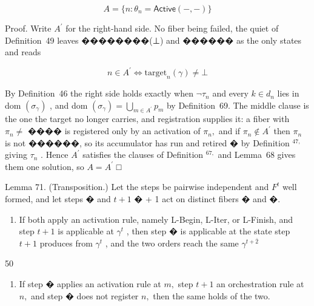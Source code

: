 \documentclass[
  10
]{article}
\providecommand{\tightlist}{%
  \setlength{\itemsep}{0pt}\setlength{\parskip}{0pt}}
\begin{document}
\[
A = \{ n : \theta _ { n } = \mathsf { A c t i v e } ( - , - ) \}\tag{64}
\]

Proof. Write \(A ^ { \prime }\) for the right-hand side. No fiber being
failed, the quiet of Definition~49 leaves ��������(⊥) and ������ as the
only states and reads

\[
n \in A ^ { \prime } \Longleftrightarrow \mathrm { t a r g e t } _ { n } ( \gamma ) \neq \bot
\]

By Definition~46 the right side holds exactly when \(\neg \tau _ { n }\)
and every \(k \in d _ { n }\) lies in dom
\(\left( \sigma _ { \gamma } \right)\) , and dom
\(\textstyle ( \sigma _ { \gamma } ) = \bigcup _ { m \in A ^ { \prime } } p _ { m }\)
by Definition~69. The middle clause is the one the target no longer
carries, and registration supplies it: a fiber with \(\pi _ { n } \neq\)
���� is registered only by an activation of \(\pi _ { n } ,\) and if
\(\pi _ { n } \notin A ^ { \prime }\) then \(\pi _ { n }\) is not
������, so its accumulator has run and retired � by Definition
\(^ { 4 7 , }\) giving \(\tau _ { n }\) . Hence \(A ^ { \prime }\)
satisfies the clauses of Definition \(^ { 6 7 , }\) and Lemma~68 gives
them one solution, so \(A = A ^ { \prime }\) □

Lemma 71. (Transposition.) Let the steps be pairwise independent and
\(F ^ { t }\) well formed, and let steps � and \(t + 1\) � + 1 act on
distinct fibers � and �.

\begin{enumerate}
\def\labelenumi{\arabic{enumi}.}
\tightlist
\item
  If both apply an activation rule, namely L-Begin, L-Iter, or L-Finish,
  and step \(t + 1\) is applicable at \(\gamma ^ { t }\) , then step �
  is applicable at the state step \(t + 1\) produces from
  \(\gamma ^ { t }\) , and the two orders reach the same
  \(\gamma ^ { t + \bar { 2 } }\)
\end{enumerate}

50

\begin{enumerate}
\def\labelenumi{\arabic{enumi}.}
\setcounter{enumi}{1}
\tightlist
\item
  If step � applies an activation rule at \(m ,\) step \(t + 1\) an
  orchestration rule at \(n ,\) and step � does not register \(n ,\)
  then the same holds of the two.
\end{enumerate}
\end{document}
